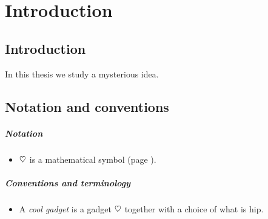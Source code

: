 %
%
%

\chapter{Introduction} %
\section{Introduction} %
\label{sec:introduction}
In this thesis we study a mysterious idea.

\section{Notation and conventions}\label{sec:conventions}%
\label{sec:summary_of_notation}

\paragraph{Notation}
\begin{itemize}\itemsep1.5pt
	\item $\heartsuit$ is a mathematical symbol (page \pageref{def:mathSymb}).
\end{itemize}

\paragraph{Conventions and terminology}
\begin{itemize}\itemsep1.5pt
	\item A \emph{cool gadget} is a gadget $\heartsuit$ together with a choice of what is hip.
\end{itemize}


